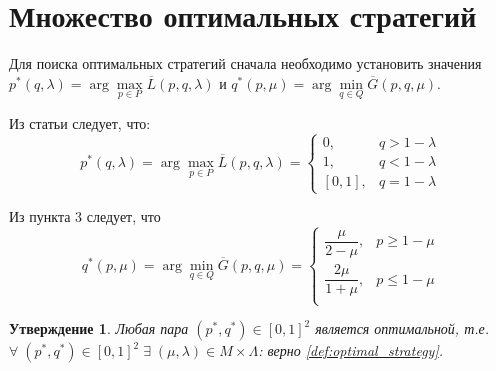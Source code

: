 \section{Множество оптимальных стратегий}

Для поиска оптимальных стратегий сначала необходимо установить значения 
$p^*(q, \lambda) = \arg \max \limits_{p \in P} \overline L(p, q, \lambda)$ и 
$q^*(p, \mu) = \arg \min \limits_{q \in Q} \overline G(p, q, \mu)$.

Из статьи \cite{novikova} следует, что:
\begin{equation}
	p^*(q, \lambda)=
	\arg \max \limits_{p \in P} \overline L(p, q, \lambda) =
	\begin{cases}
		0, & q > 1 - \lambda \\
		1, & q < 1 - \lambda \\
		[0,1], & q = 1 - \lambda
	\end{cases}
\end{equation}

Из пункта 3 следует, что
\begin{equation}
	q^*(p, \mu) = \arg \min \limits_{q \in Q} \overline G(p, q, \mu) =
	\begin{cases}
		\dfrac{\mu}{2 - \mu}, & p \geqslant 1 - \mu \\
		\dfrac{2\mu}{1 + \mu}, & p \leqslant 1 -\mu \\
	\end{cases}
\end{equation}


\newtheorem{State}{Утверждение}
\begin{State}
	Любая пара $(p^{*}, q^{*}) \in [0, 1]^{2}$ является оптимальной, т.е.  
	$\forall \; (p^{*}, q^{*}) \in [0, 1]^{2} \; \exists \; 
	(\mu, \lambda) \in M \times \Lambda$: 
	верно \eqref{def:optimal_strategy}.
\end{State}


